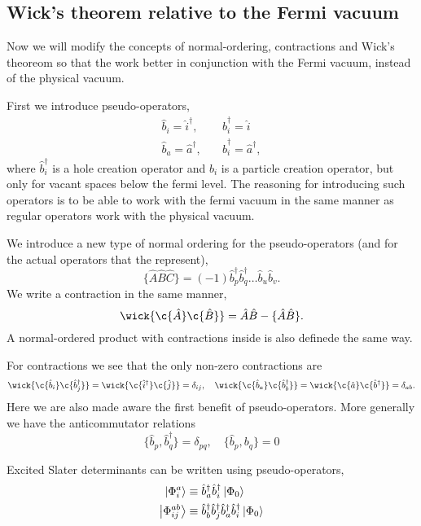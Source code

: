 	\subsection{Wick's theorem relative to the Fermi vacuum}

		Now we will modify the concepts of normal-ordering, contractions and Wick's 
		theoreom so that the work better in conjunction with the Fermi vacuum, instead 
		of the physical vacuum.

		First we introduce pseudo-operators,
		\begin{equation}
			\begin{aligned}
				\hat{b}_i = \hat{i}^\dagger, &\quad \hat{b}_i^\dagger = \hat{i} \\
				\hat{b}_a = \hat{a}^\dagger, &\quad \hat{b}_i^\dagger = \hat{a}^\dagger,
			\end{aligned}
		\end{equation}
		where $\hat{b}_i^\dagger$ is a hole creation operator and $\hat{b}_i$ is a particle
		creation operator, but only for vacant spaces below the fermi level. The reasoning 
		for introducing such operators is to be able to work with the fermi vacuum in the 
		same manner as regular operators work with the physical vacuum.

		We introduce a new type of normal ordering for the pseudo-operators (and for the
		actual operators that the represent),
		\begin{equation}
			\{\hat{A}\hat{B}\hat{C} \} 
				= (-1)\hat{b}_p^\dagger\hat{b}_q^\dagger \dots \hat{b}_u \hat{b}_v.
		\end{equation}
		We write a contraction in the same manner,
		\begin{equation}
			\wick{\c{\hat{A}}\c{\hat{B}}} = \hat{A}\hat{B} - \{\hat{A}\hat{B}\}.
		\end{equation}
		A normal-ordered product with contractions inside is also definede the same 
		way.
			
		For contractions we see that the only non-zero contractions are
		\begin{equation}
			\wick{\c{\hat{b}_i}\c{\hat{b}_j^\dagger}} =	
			\wick{\c{\hat{i}^\dagger}\c{\hat{j}}} = \delta_{ij}, \quad
			\wick{\c{\hat{b}_a}\c{\hat{b}_b^\dagger}} =
			\wick{\c{\hat{a}}\c{\hat{b}^\dagger}} = \delta_{ab}.
		\end{equation}
		Here we are also made aware the first benefit of pseudo-operators. More generally 
		we have the anticommutator relations
		\begin{equation}
			\{\hat{b}_p, \hat{b}_q^\dagger\} = \delta_{pq}, \quad
			\{\hat{b}_p, b_q\} = 0
		\end{equation}

		Excited Slater determinants can be written using pseudo-operators,
		\begin{align}
			\ket{\Phi_i^a} &\equiv \hat{b}_a^\dagger\hat{b}_i^\dagger \ket{\Phi_0} \\
			\ket{\Phi_{ij}^{ab}} &\equiv 
				\hat{b}_b^\dagger \hat{b}_j^\dagger \hat{b}_a^\dagger \hat{b}_i^\dagger 
				\ket{\Phi_0}
		\end{align}

